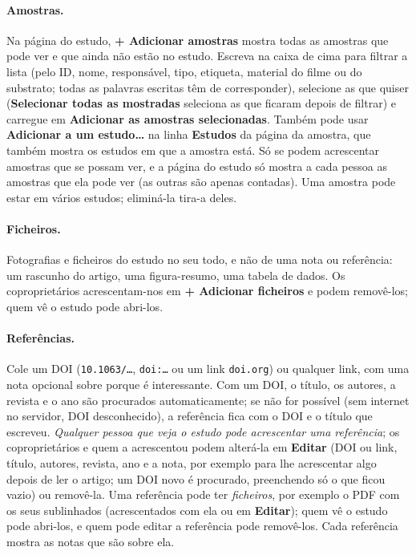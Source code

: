 \documentclass[11pt,a4paper]{article}
\newcommand{\ui}[1]{\textsf{\textbf{#1}}}
\begin{document}
\paragraph{Amostras.} Na página do estudo, \ui{+ Adicionar amostras} mostra
todas as amostras que pode ver e que ainda não estão no estudo. Escreva na
caixa de cima para filtrar a lista (pelo ID, nome, responsável, tipo,
etiqueta, material do filme ou do substrato; todas as palavras escritas têm
de corresponder), selecione as que quiser (\ui{Selecionar todas as mostradas}
seleciona as que ficaram depois de filtrar) e carregue em
\ui{Adicionar as amostras selecionadas}. Também pode usar
\ui{Adicionar a um estudo…} na linha
\ui{Estudos} da página da amostra, que também mostra os estudos em que a
amostra está. Só se podem acrescentar amostras que se possam ver, e a página
do estudo só mostra a cada pessoa as amostras que ela pode ver (as outras são
apenas contadas). Uma amostra pode estar em vários estudos; eliminá-la tira-a
deles.

\paragraph{Ficheiros.} Fotografias e ficheiros do estudo no seu todo, e não
de uma nota ou referência: um rascunho do artigo, uma figura-resumo, uma
tabela de dados. Os coproprietários acrescentam-nos em
\ui{+ Adicionar ficheiros} e podem removê-los; quem vê o estudo pode abri-los.

\paragraph{Referências.} Cole um DOI (\texttt{10.1063/\ldots},
\texttt{doi:\ldots} ou um link \texttt{doi.org}) ou qualquer link, com uma
nota opcional sobre porque é interessante. Com um DOI, o título, os autores,
a revista e o ano são procurados automaticamente; se não for possível (sem
internet no servidor, DOI desconhecido), a referência fica com o DOI e o
título que escreveu. \emph{Qualquer pessoa que veja o estudo pode acrescentar
uma referência}; os coproprietários e quem a acrescentou podem alterá-la em
\ui{Editar} (DOI ou link, título, autores, revista, ano e a nota, por exemplo
para lhe acrescentar algo depois de ler o artigo; um DOI novo é procurado,
preenchendo só o que ficou vazio) ou removê-la. Uma referência pode ter
\emph{ficheiros}, por exemplo o PDF com os seus sublinhados (acrescentados
com ela ou em \ui{Editar}); quem vê o estudo pode abri-los, e quem pode editar
a referência pode removê-los. Cada referência mostra as notas que são sobre ela.
\end{document}
